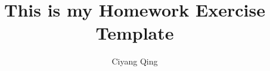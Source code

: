 \documentclass[12pt,a4paper]{article}
\begin{document}
\title{This is my Homework Exercise Template}
\author{Ciyang Qing}

\maketitle



   
    
       
   




%
%
%
 
 
%
 
\end{document}
